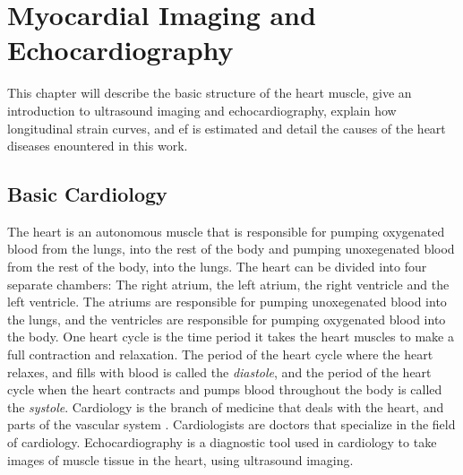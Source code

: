 \chapter{Myocardial Imaging and Echocardiography} \label{chap:strain}

This chapter will describe the basic structure of the heart muscle, give an introduction to ultrasound imaging and echocardiography, explain how longitudinal strain curves, and \acrfull{ef} is estimated and detail the causes of the heart diseases enountered in this work.

\section{Basic Cardiology}

The heart is an autonomous muscle that is responsible for pumping oxygenated blood from the lungs, into the rest of the body and pumping unoxegenated blood from the rest of the body, into the lungs. The heart can be divided into four separate chambers: The right atrium, the left atrium, the right ventricle and the left ventricle. The atriums are responsible for pumping unoxegenated blood into the lungs, and the ventricles are responsible for pumping oxygenated blood into the body. One heart cycle is the time period it takes the heart muscles to make a full contraction and relaxation. The period of the heart cycle where the heart relaxes, and fills with blood is called the \textit{diastole}, and the period of the heart cycle when the heart contracts and pumps blood throughout the body is called the \textit{systole}. Cardiology is the branch of medicine that deals with the heart, and parts of the vascular system \cite{cardiology_wikipedia}. Cardiologists are doctors that specialize in the field of cardiology. Echocardiography is a diagnostic tool used in cardiology to take images of muscle tissue in the heart, using ultrasound imaging. 

